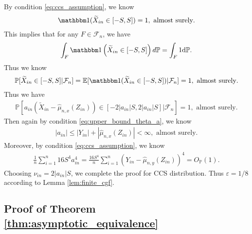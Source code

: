 \documentclass[12pt]{article}
\theoremstyle{definition}
\def\P{\mathbb{P}}
\def\P{\mathbb{P}}
\newcommand{\E}{\mathbb E}								%
\renewcommand{\P}{\mathbb{P}}							%
\newcommand{\indicator}{\mathbbm 1}						%
\newcommand{\srz}{Z}									%
\newcommand{\srxk}{\widetilde X}						%
\newcommand{\sry}{Y}									%
\begin{document}
By condition \eqref{eq:ccs_assumption}, we know 
\begin{align*}
  \indicator(\widetilde{X}_{in}\in [-S,S])=1,\text{ almost surely}.
\end{align*}
This implies that for any $F\in\mathcal{F}_n$, we have 
\begin{align*}
  \int_F \indicator\left(\widetilde{X}_{in}\in [-S,S]\right)d\mathbb{P}=\int_F 1 \mathrm{d}\mathbb P.
\end{align*}
Thus we know 
\begin{align*}
  \P[\widetilde{X}_{in}\in [-S,S]|\mathcal{F}_n]=\E[\indicator(\widetilde{X}_{in}\in [-S,S])|\mathcal{F}_n]=1,\text{ almost surely}.
\end{align*}
Thus we have
\begin{align*}
  \P\left[a_{in}(\srxk_{in}-\widehat{\mu}_{n,x}(\srz_{in}))\in [-2|a_{in}|S,2|a_{in}|S]|\mathcal{F}_n\right]=1,\text{ almost surely}.
\end{align*}
Then again by condition \eqref{eq:upper_bound_theta_a}, we know 
\begin{align*}
  |a_{in}|\leq |\sry_{in}|+|\widehat{\mu}_{n,x}(\srz_{in})|<\infty,\text{ almost surely}.
\end{align*}
Moreover, by condition \eqref{eq:ccs_assumption}, we know 
\begin{align*}
  \frac{1}{n}\sum_{i=1}^n 16S^4a_{in}^4=\frac{16S^4}{n}\sum_{i=1}^n (\sry_{in}-\widehat{\mu}_{n,y}(\srz_{in}))^4=O_{\P}(1).
\end{align*}
Choosing $\nu_{in}=2|a_{in}|S$, we complete the proof for CCS distribution. Thus $\varepsilon=1/8$ according to Lemma \ref{lem:finite_cgf}.


  \subsection{Proof of Theorem \ref{thm:asymptotic_equivalence}}
\end{document}
